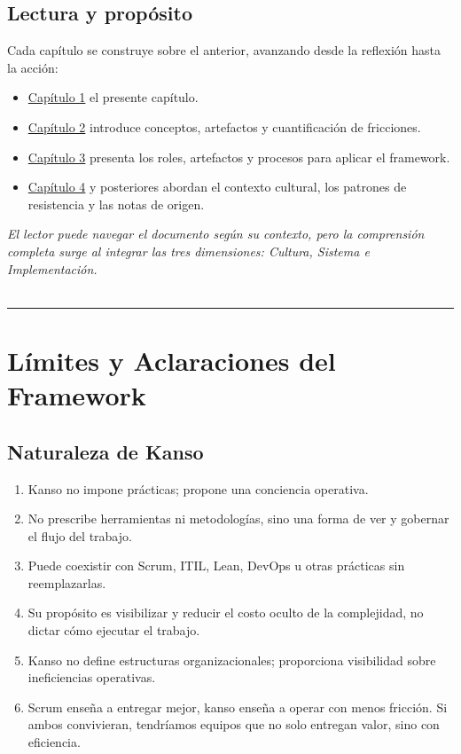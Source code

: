 \subsection*{Lectura y propósito}
Cada capítulo se construye sobre el anterior, avanzando desde la reflexión hasta la acción:

\begin{itemize}
    \item \hyperref[chap:one]{Capítulo 1} el presente capítulo.
    \item \hyperref[chap:two]{Capítulo 2} introduce conceptos, artefactos y cuantificación de fricciones.
    \item \hyperref[chap:three]{Capítulo 3} presenta los roles, artefactos y procesos para aplicar el framework.
    \item \hyperref[chap:four]{Capítulo 4} y posteriores abordan el contexto cultural, los patrones de resistencia y las notas de origen.
\end{itemize}

\textit{El lector puede navegar el documento según su contexto, pero la comprensión completa surge al integrar las tres dimensiones: Cultura, Sistema e Implementación.}
\\
\\
\hrule
\section{Límites y Aclaraciones del Framework}

\subsection*{Naturaleza de Kanso}
\begin{enumerate}
    \item Kanso no impone prácticas; propone una conciencia operativa.
    \item No prescribe herramientas ni metodologías, sino una forma de ver y gobernar el flujo del trabajo.
    \item Puede coexistir con Scrum, ITIL, Lean, DevOps u otras prácticas sin reemplazarlas.
    \item Su propósito es visibilizar y reducir el costo oculto de la complejidad, no dictar cómo ejecutar el trabajo.
    \item Kanso no define estructuras organizacionales; proporciona visibilidad sobre ineficiencias operativas.
    \item Scrum enseña a entregar mejor, kanso enseña a operar con menos fricción. Si ambos convivieran, tendríamos equipos que no solo entregan valor, sino con eficiencia.
\end{enumerate}


